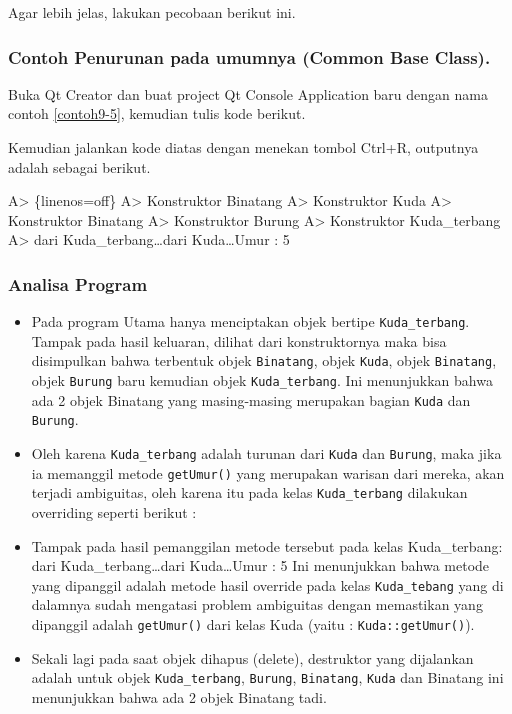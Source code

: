 

Agar lebih jelas, lakukan pecobaan berikut ini.

\subsubsection*{Contoh Penurunan pada umumnya (Common Base Class).}

Buka Qt Creator dan buat project Qt Console Application baru dengan nama
contoh \ref{contoh9-5}, kemudian tulis kode berikut.





Kemudian jalankan kode diatas dengan menekan tombol Ctrl+R, outputnya
adalah sebagai berikut.

A\textgreater{} \{linenos=off\} A\textgreater{} Konstruktor Binatang
A\textgreater{} Konstruktor Kuda A\textgreater{} Konstruktor Binatang
A\textgreater{} Konstruktor Burung A\textgreater{} Konstruktor
Kuda\_terbang A\textgreater{} dari Kuda\_terbang\ldots{}dari
Kuda\ldots{}Umur : 5

\subsubsection*{Analisa Program}

\begin{itemize}
\item
 Pada program Utama hanya menciptakan objek bertipe
 \texttt{Kuda\_terbang}. Tampak pada hasil keluaran, dilihat dari
 konstruktornya maka bisa disimpulkan bahwa terbentuk objek
 \texttt{Binatang}, objek \texttt{Kuda}, objek \texttt{Binatang}, objek
 \texttt{Burung} baru kemudian objek \texttt{Kuda\_terbang}. Ini
 menunjukkan bahwa ada 2 objek Binatang yang masing-masing merupakan
 bagian \texttt{Kuda} dan \texttt{Burung}.
\item
 Oleh karena \texttt{Kuda\_terbang} adalah turunan dari \texttt{Kuda}
 dan \texttt{Burung}, maka jika ia memanggil metode \texttt{getUmur()}
 yang merupakan warisan dari mereka, akan terjadi ambiguitas, oleh
 karena itu pada kelas \texttt{Kuda\_terbang} dilakukan overriding
 seperti berikut :


\item
 Tampak pada hasil pemanggilan metode tersebut pada kelas
 Kuda\_terbang: dari Kuda\_terbang\ldots{}dari Kuda\ldots{}Umur : 5 Ini
 menunjukkan bahwa metode yang dipanggil adalah metode hasil override
 pada kelas \texttt{Kuda\_tebang} yang di dalamnya sudah mengatasi
 problem ambiguitas dengan memastikan yang dipanggil adalah
 \texttt{getUmur()} dari kelas Kuda (yaitu : \texttt{Kuda::getUmur()}).
\item
 Sekali lagi pada saat objek dihapus (delete), destruktor yang
 dijalankan adalah untuk objek \texttt{Kuda\_terbang}, \texttt{Burung},
 \texttt{Binatang}, \texttt{Kuda} dan Binatang ini menunjukkan bahwa
 ada 2 objek Binatang tadi.
\end{itemize}


